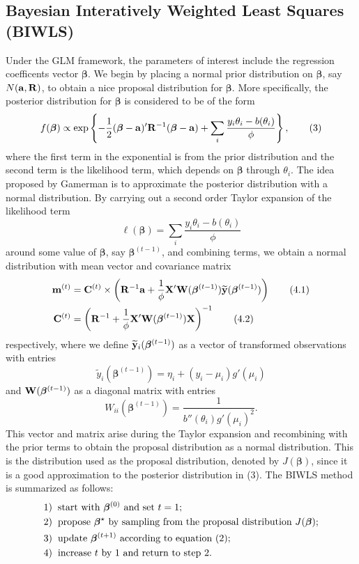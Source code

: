 \documentclass[12pt]{extarticle}
\begin{document}
\subsection{Bayesian Interatively Weighted Least Squares (BIWLS)}
\noindent  Under the GLM framework, the parameters of interest include the regression coefficents vector $\boldsymbol\beta$.
We begin by placing a normal prior distribution on $\boldsymbol\beta$, say $N({\bf a},{\bf R})$, to obtain a nice proposal distribution for $\boldsymbol\beta$.  More specifically, the posterior distribution for $\boldsymbol\beta$ is considered to be of the form
\[
f(\boldsymbol\beta) \propto \exp\left\{ -\frac{1}{2}(\boldsymbol\beta - {\bf a})'{\bf R}^{-1}(\boldsymbol\beta - {\bf a}) + \sum_i \frac{y_i\theta_i - b(\theta_i)}{\phi} \right\}, \tag{3}
\]
where the first term in the exponential is from the prior distribution and the second term is the likelihood term, which depends on $\boldsymbol\beta$ through $\theta_i$.  The idea proposed by Gamerman is to approximate the posterior distribution with a normal distribution.  By carrying out a second order Taylor expansion of the likelihood term
\[
\ell(\boldsymbol\beta) = \sum_i \frac{y_i\theta_i - b(\theta_i)}{\phi}
\]
around some value of $\boldsymbol\beta$, say $\boldsymbol\beta^{(t-1)}$, and combining terms, we obtain a normal distribution with mean vector and covariance matrix
\begin{align*}
{\bf m}^{(t)} &= {\bf C}^{(t)}\times\left({\bf R}^{-1}{\bf a} + \frac{1}{\phi}{\bf X}'{\bf W}(\boldsymbol\beta^{(t-1)})\widetilde{{\bf y}}(\boldsymbol\beta^{(t-1)})\right) \tag{4.1} \\
{\bf C}^{(t)} &= \left({\bf R}^{-1} + \frac{1}{\phi}{\bf X}'{\bf W}(\boldsymbol\beta^{(t-1)}){\bf X}\right)^{-1} \tag{4.2}
\end{align*}
respectively, where we define $\widetilde{{\bf y}}_i(\boldsymbol\beta^{(t-1)})$ as a vector of transformed observations with entries
\[
\widetilde{y}_i(\boldsymbol\beta^{(t-1)}) = \eta_i + (y_i - \mu_i)g'(\mu_i)
\]
and ${\bf W}(\boldsymbol\beta^{(t-1)})$ as a diagonal matrix with entries
\[
{W}_{ii}(\boldsymbol\beta^{(t-1)}) = \frac{1}{b''(\theta_i)g'(\mu_i)^2}.
\]
This vector and matrix arise during the Taylor expansion and recombining with the prior terms to obtain the proposal distribution as a normal distribution.  This is the distribution used as the proposal distribution, denoted by $J(\boldsymbol\beta)$, since it is a good approximation to the posterior distribution in (3).  The BIWLS method is summarized as follows:
\begin{align*}
&1) \hspace{2mm}\text{start with $\boldsymbol\beta^{(0)}$ and set $t=1$}; \\
&2)  \hspace{2mm}\text{propose $\boldsymbol\beta^\star$ by sampling  from the proposal distribution $J(\bm\beta)$}; \\
&3)  \hspace{2mm}\text{update $\boldsymbol\beta^{(t+1)}$ according to equation (2)}; \\
&4)  \hspace{2mm}\text{increase $t$ by 1 and return to step 2}.
\end{align*}
\end{document}
